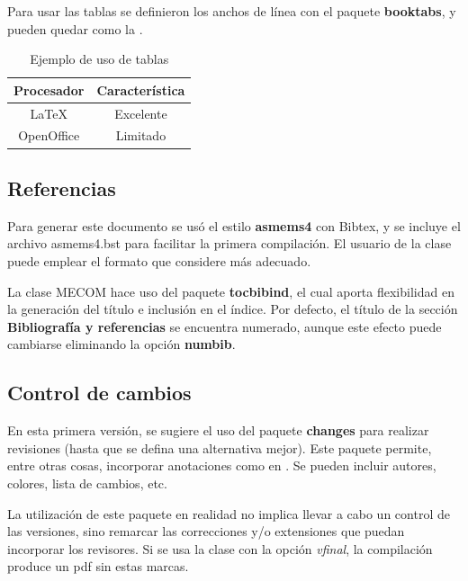 \documentclass[a4paper,11pt,twoside]{MECOM}
\begin{document}
    
    \par
    Para usar las tablas se definieron los anchos de l\'inea con el paquete {\bf booktabs}, y pueden quedar como la .
    \begin{table}[ht]
        \centering
        \begin{tabular}{c c}
            \toprule
            \bf Procesador & \bf Caracter\'istica \\
            \midrule
            \LaTeX{} & Excelente \\
            OpenOffice & Limitado\\
            \bottomrule
        \end{tabular}
        \caption{Ejemplo de uso de tablas}
        \label{tab:prueba}
    \end{table}    
    


    
    \subsection{Referencias}
    Para generar este documento se us\'o el estilo {\bf asmems4} con Bibtex, y se incluye el archivo asmems4.bst para facilitar la primera compilaci\'on. El usuario de la clase puede emplear el formato que considere m\'as adecuado.
    \par
    La clase MECOM hace uso del paquete {\bf tocbibind}, el cual aporta flexibilidad en la generaci\'on del t\'itulo e inclusi\'on en el \'indice. Por defecto, el t\'itulo de la secci\'on {\bf Bibliograf\'ia y referencias} se encuentra numerado, aunque este efecto puede cambiarse eliminando la opci\'on {\bf numbib}.
    
    
    
    \subsection{Control de cambios}
    En esta primera versi\'on, se sugiere el uso del paquete {\bf changes} para realizar revisiones (hasta que se defina una alternativa mejor). Este paquete permite, entre otras cosas, incorporar anotaciones como en . Se pueden incluir autores, colores, lista de cambios, etc.
    \par
    La utilizaci\'on de este paquete en realidad no implica llevar a cabo un control de las versiones, sino remarcar las correcciones y/o extensiones que puedan incorporar los revisores. Si se usa la clase con la opci\'on \emph{vfinal}, la compilaci\'on produce un pdf sin estas marcas.
    
\end{document}
